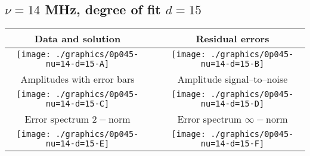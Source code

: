 

% 

\clearpage{}
\break{}

\subsection{$\nu = 14$ MHz, degree of fit $d = 15$}

\begin{table}[h]
    \begin{center}
        \begin{tabular}{ccc}
            Data and solution & \quad & Residual errors \\\hline
            \texttt{[image: ./graphics/0p045-nu=14-d=15-A]} &&
            \texttt{[image: ./graphics/0p045-nu=14-d=15-B]} \\[15pt]
            Amplitudes with error bars && Amplitude signal--to--noise \\\hline
            \texttt{[image: ./graphics/0p045-nu=14-d=15-C]} &&
            \texttt{[image: ./graphics/0p045-nu=14-d=15-D]} \\[15pt]
            Error spectrum $2-$norm && Error spectrum $\infty-$norm \\\hline
            \texttt{[image: ./graphics/0p045-nu=14-d=15-E]} &&
            \texttt{[image: ./graphics/0p045-nu=14-d=15-F]} \\[15pt]
        \end{tabular}
    \end{center}
\label{fig:elev=45, nu=14}
\end{table}



\endinput
